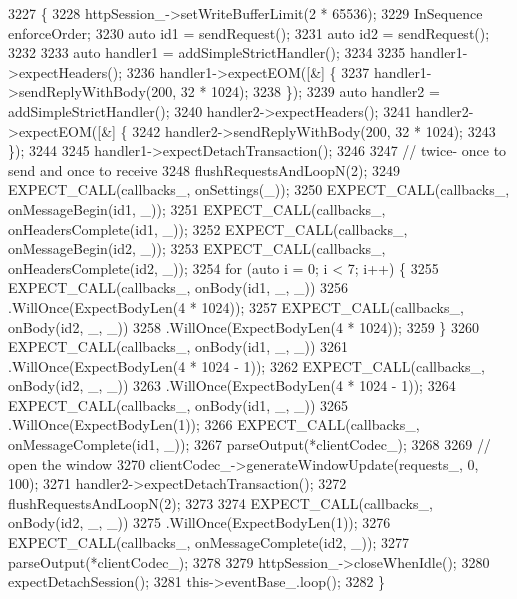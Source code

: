\begin{DoxyCode}
3227                                                                   \{
3228   httpSession\_->setWriteBufferLimit(2 * 65536);
3229   InSequence enforceOrder;
3230   \textcolor{keyword}{auto} id1 = sendRequest();
3231   \textcolor{keyword}{auto} id2 = sendRequest();
3232 
3233   \textcolor{keyword}{auto} handler1 = addSimpleStrictHandler();
3234 
3235   handler1->expectHeaders();
3236   handler1->expectEOM([&] \{
3237       handler1->sendReplyWithBody(200, 32 * 1024);
3238     \});
3239   \textcolor{keyword}{auto} handler2 = addSimpleStrictHandler();
3240   handler2->expectHeaders();
3241   handler2->expectEOM([&] \{
3242       handler2->sendReplyWithBody(200, 32 * 1024);
3243     \});
3244 
3245   handler1->expectDetachTransaction();
3246 
3247   \textcolor{comment}{// twice- once to send and once to receive}
3248   flushRequestsAndLoopN(2);
3249   EXPECT\_CALL(callbacks\_, onSettings(\_));
3250   EXPECT\_CALL(callbacks\_, onMessageBegin(id1, \_));
3251   EXPECT\_CALL(callbacks\_, onHeadersComplete(id1, \_));
3252   EXPECT\_CALL(callbacks\_, onMessageBegin(id2, \_));
3253   EXPECT\_CALL(callbacks\_, onHeadersComplete(id2, \_));
3254   \textcolor{keywordflow}{for} (\textcolor{keyword}{auto} i = 0; i < 7; i++) \{
3255     EXPECT\_CALL(callbacks\_, onBody(id1, \_, \_))
3256       .WillOnce(ExpectBodyLen(4 * 1024));
3257     EXPECT\_CALL(callbacks\_, onBody(id2, \_, \_))
3258       .WillOnce(ExpectBodyLen(4 * 1024));
3259   \}
3260   EXPECT\_CALL(callbacks\_, onBody(id1, \_, \_))
3261     .WillOnce(ExpectBodyLen(4 * 1024 - 1));
3262   EXPECT\_CALL(callbacks\_, onBody(id2, \_, \_))
3263     .WillOnce(ExpectBodyLen(4 * 1024 - 1));
3264   EXPECT\_CALL(callbacks\_, onBody(id1, \_, \_))
3265     .WillOnce(ExpectBodyLen(1));
3266   EXPECT\_CALL(callbacks\_, onMessageComplete(id1, \_));
3267   parseOutput(*clientCodec\_);
3268 
3269   \textcolor{comment}{// open the window}
3270   clientCodec\_->generateWindowUpdate(requests\_, 0, 100);
3271   handler2->expectDetachTransaction();
3272   flushRequestsAndLoopN(2);
3273 
3274   EXPECT\_CALL(callbacks\_, onBody(id2, \_, \_))
3275     .WillOnce(ExpectBodyLen(1));
3276   EXPECT\_CALL(callbacks\_, onMessageComplete(id2, \_));
3277   parseOutput(*clientCodec\_);
3278 
3279   httpSession\_->closeWhenIdle();
3280   expectDetachSession();
3281   this->eventBase\_.loop();
3282 \}
\end{DoxyCode}
